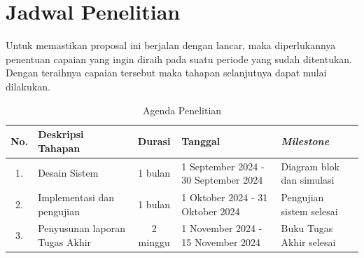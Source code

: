 \section{Jadwal Penelitian}
Untuk memastikan proposal ini berjalan dengan lancar, maka diperlukannya penentuan capaian yang ingin diraih pada suatu periode yang sudah ditentukan. Dengan teraihnya capaian tersebut maka tahapan selanjutnya dapat mulai dilakukan.

\begin{center}
	\begin{longtable}{|c|m{3.8cm}|c | m{3cm} |m{3cm}|}
		\caption{Agenda Penelitian}
		\label{tab:Agenda}\\
		\hline
		No. & Deskripsi Tahapan & Durasi & Tanggal & \textit{Milestone} \\
		\hline
		1. & Desain Sistem & 1 bulan & 1 September 2024 - 30 September 2024 & Diagram blok dan simulasi \\
		\hline
		2. & Implementasi dan pengujian& 1 bulan & 1 Oktober 2024 - 31 Oktober 2024 & Pengujian sistem selesai \\
		\hline
		3. & Penyusunan laporan Tugas Akhir & 2 minggu & 1 November 2024 - 15 November 2024 & Buku Tugas Akhir selesai \\
		\hline
	\end{longtable}
\end{center}

